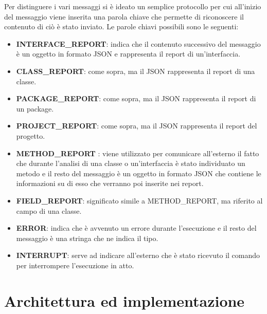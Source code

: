 Per distinguere i vari messaggi si è ideato un semplice protocollo per cui all'inizio del messaggio viene inserita una parola chiave che permette di riconoscere il contenuto di ciò è stato inviato.
Le parole chiavi possibili sono le seguenti:

\begin{itemize}
    \item \textbf{INTERFACE\_REPORT}: indica che il contenuto successivo del messaggio è un oggetto in formato JSON e rappresenta il report di un'interfaccia.

    \item \textbf{CLASS\_REPORT}: come sopra, ma il JSON rappresenta il report di una classe.

    \item \textbf{PACKAGE\_REPORT}: come sopra, ma il JSON rappresenta il report di un package.

    \item \textbf{PROJECT\_REPORT}: come sopra, ma il JSON rappresenta il report del progetto.

    \item \textbf{METHOD\_REPORT} \label{itemize:method_report}: viene utilizzato per comunicare all'esterno il fatto che durante l'analisi di una classe o un'interfaccia è stato individuato un metodo e il resto del messaggio è un oggetto in formato JSON che contiene le informazioni su di esso che verranno poi inserite nei report.

    \item \textbf{FIELD\_REPORT}: significato simile a METHOD\_REPORT, ma riferito al campo di una classe.

    \item \textbf{ERROR}: indica che è avvenuto un errore durante l'esecuzione e il resto del messaggio è una stringa che ne indica il tipo.

    \item \textbf{INTERRUPT}: serve ad indicare all'esterno che è stato ricevuto il comando per interrompere l'esecuzione in atto.

\end{itemize}


\section{Architettura ed implementazione}

